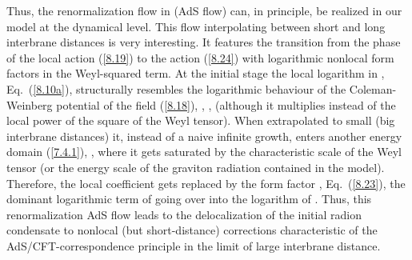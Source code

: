 \documentclass[a4paper,preprint,nofootinbib,
                 showpacs,preprintnumbers,amsmath,amssymb]{revtex4}
\begin{document}
Thus, the renormalization flow in \coordHE{} (AdS flow) can, in principle,  
be realized in our model at the dynamical level. This flow  
interpolating between  short and long  
interbrane distances is very interesting. It features the 
transition from the phase of the local action (\ref{8.19}) to 
the action (\ref{8.24}) with logarithmic nonlocal form factors in the 
Weyl-squared term. At the initial stage the local logarithm in 
\coordHE{}, Eq.~(\ref{8.10a}), structurally  
resembles the logarithmic behaviour of the Coleman-Weinberg potential 
of the field (\ref{8.18}), \coordHE{},  
\coordHE{}, \coordHE{} 
(although it multiplies instead of the local power of \myHighlight{$\varphi$}\coordHE{} the 
square of the Weyl tensor). When extrapolated to small \coordHE{} (big  
interbrane distances) it, instead of a naive infinite growth, enters 
another energy domain (\ref{7.4.1}),  
\coordHE{}, where it gets saturated by the 
characteristic scale of the Weyl tensor (or the energy scale of the 
graviton radiation contained in the model). Therefore, the local  
coefficient \coordHE{} gets replaced by the form factor  
\coordHE{}, Eq.~(\ref{8.23}), the dominant logarithmic term of  
\coordHE{} going over into the  
logarithm of \coordHE{}. Thus, this  
renormalization AdS flow leads to the delocalization of the 
initial radion condensate \coordHE{} 
to nonlocal (but short-distance) corrections  
\coordHE{} 
characteristic of the AdS/CFT-correspondence principle in the limit of 
large interbrane distance. 
 
\end{document}
